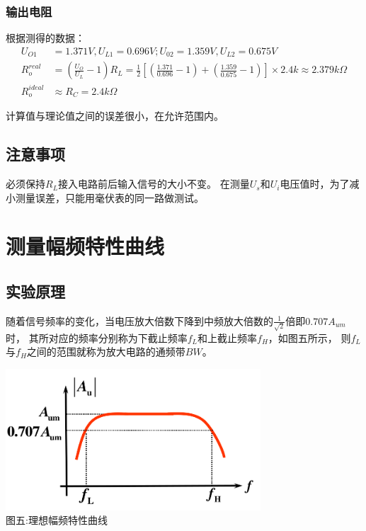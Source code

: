 \documentclass[a4paper]{article}
\begin{document}
    \subsubsection{输出电阻}
    {{根据测得的数据：}}
    \begin{equation}
        \begin{aligned}
            U_{O1}&=1.371V,U_{L1}=0.696V;U_{02}=1.359V,U_{L2}=0.675V\\
            R_o^{real}&=(\frac{U_O}{U_L}-1)R_L=\frac{1}{2}[(\frac{1.371}{0.696}-1)+(\frac{1.359}{0.675}-1)]\times2.4k\approx2.379k\Omega\\
            R_o^{ideal}&\approx R_C=2.4k\Omega
        \end{aligned}\label{eq:equation8}
    \end{equation}

    {{计算值与理论值之间的误差很小，在允许范围内。}}

    \subsection{注意事项}\label{subsec:12}
    {{必须保持$R_L$接入电路前后输入信号的大小不变。}}
    {{在测量$U_s$和$U_i$电压值时，为了减小测量误差，只能用毫伏表的同一路做测试。}}
    \vspace{1cm}


    \section{测量幅频特性曲线}\label{sec:6}

    \subsection{实验原理}\label{subsec:13}
    {{随着信号频率的变化，当电压放大倍数下降到中频放大倍数的$\frac{1}{\sqrt{2}}$倍即$0.707A_{um}$时，
    其所对应的频率分别称为下截止频率$f_L$和上截止频率$f_H$，如图五所示，
    则$f_L$与$f_H$之间的范围就称为放大电路的通频带$BW$。}}
    \begin{center}
        \includegraphics[height=150pt]{Af}\\
        {\small 图五:理想幅频特性曲线}
    \end{center}
\end{document}
